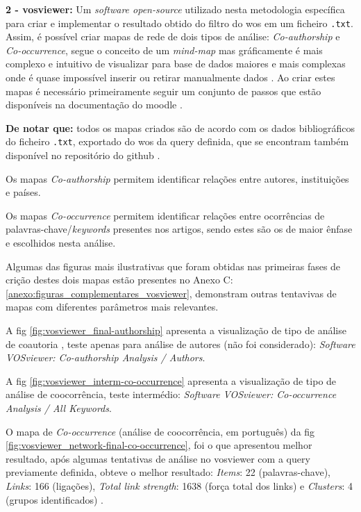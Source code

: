 {\setlength{\parindent}{0pt}
\textbf{ 2 - \gls{vosviewer}:}
}
Um  \textit{ software open-source} utilizado nesta metodologia específica para criar  e implementar o resultado obtido do filtro do \gls{wos} em um ficheiro \verb|.txt|. 
Assim, é possível criar mapas de rede de dois tipos de análise: \textit{Co-authorship} e \textit{Co-occurrence}, segue o conceito de um \textit{mind-map} mas gráficamente é mais complexo e intuitivo de visualizar para base de dados maiores e mais complexas onde é quase impossível inserir ou retirar manualmente dados \cite{VOSviewer2026}.
Ao criar estes mapas é necessário primeiramente seguir um conjunto de passos que estão disponíveis na documentação do \gls{moodle} \cite{MoodleEnunciado}.

\textbf{De notar que:} todos os mapas criados são de acordo com os dados bibliográficos do ficheiro \verb|.txt|, exportado do \gls{wos} da \gls{query} definida, que se encontram também disponível no repositório do \gls{github} \cite{JunqueiraDevEduardoRepositório}.

Os mapas \textit{Co-authorship} permitem identificar relações entre autores, instituições e países.

Os mapas \textit{Co-occurrence} permitem identificar relações entre ocorrências de palavras-chave/\textit{keywords} presentes nos artigos, sendo estes são os de maior ênfase e escolhidos nesta análise.


Algumas das figuras mais ilustrativas que foram obtidas nas primeiras fases de crição destes dois mapas estão presentes no Anexo C: \ref{anexo:figuras_complementares_vosviewer}, demonstram outras tentavivas de mapas com diferentes parâmetros mais relevantes.


A \gls{fig} \ref{fig:vosviewer_final-authorship} apresenta a visualização  de tipo de análise de coautoria , teste apenas para análise de autores (não foi considerado): \textit{Software VOSviewer: Co-authorship Analysis / Authors}.

A \gls{fig} \ref{fig:vosviewer_interm-co-occurrence} apresenta a visualização de tipo de análise de coocorrência, teste intermédio: \textit{Software VOSviewer: Co-occurrence Analysis / All Keywords}.


O mapa de \textit{Co-occurrence} (análise de coocorrência, em português) da  \gls{fig} \ref{fig:vosviewer_network-final-co-occurrence}, foi o que apresentou melhor resultado, após algumas tentativas de análise no \gls{vosviewer} com a \gls{query} previamente definida, obteve o melhor resultado: \textit{Items}: 22 (palavras-chave), \textit{Links}: 166 (ligações), \textit{Total link strength}: 1638 (força total dos links) e \textit{Clusters}: 4 (grupos identificados) \cite{VosViewerResult2025}.



